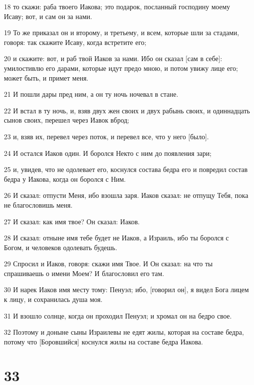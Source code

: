 \par 18 то скажи: раба твоего Иакова; это подарок, посланный господину моему Исаву; вот, и сам он за нами.
\par 19 То же приказал он и второму, и третьему, и всем, которые шли за стадами, говоря: так скажите Исаву, когда встретите его;
\par 20 и скажите: вот, и раб твой Иаков за нами. Ибо он сказал [сам в себе]: умилостивлю его дарами, которые идут предо мною, и потом увижу лице его; может быть, и примет меня.
\par 21 И пошли дары пред ним, а он ту ночь ночевал в стане.
\par 22 И встал в ту ночь, и, взяв двух жен своих и двух рабынь своих, и одиннадцать сынов своих, перешел через Иавок вброд;
\par 23 и, взяв их, перевел через поток, и перевел все, что у него [было].
\par 24 И остался Иаков один. И боролся Некто с ним до появления зари;
\par 25 и, увидев, что не одолевает его, коснулся состава бедра его и повредил состав бедра у Иакова, когда он боролся с Ним.
\par 26 И сказал: отпусти Меня, ибо взошла заря. Иаков сказал: не отпущу Тебя, пока не благословишь меня.
\par 27 И сказал: как имя твое? Он сказал: Иаков.
\par 28 И сказал: отныне имя тебе будет не Иаков, а Израиль, ибо ты боролся с Богом, и человеков одолевать будешь.
\par 29 Спросил и Иаков, говоря: скажи имя Твое. И Он сказал: на что ты спрашиваешь о имени Моем? И благословил его там.
\par 30 И нарек Иаков имя месту тому: Пенуэл; ибо, [говорил он], я видел Бога лицем к лицу, и сохранилась душа моя.
\par 31 И взошло солнце, когда он проходил Пенуэл; и хромал он на бедро свое.
\par 32 Поэтому и доныне сыны Израилевы не едят жилы, которая на составе бедра, потому что [Боровшийся] коснулся жилы на составе бедра Иакова.

\chapter{33}

